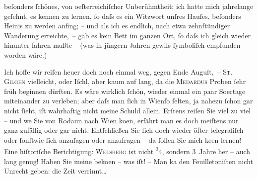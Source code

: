                beſonders{ }ſchönes, von oeſterreichiſcher
               Unberühmtheit; ich hatte mich jahrelange geſehnt, es kennen zu lernen,{ }ſo daſs es ein
               Witzwort unſres Hauſes, beſonders Heinis zu
               werden anfing; – und als {\pb}ich es endlich, nach etwa
               zehnſtündiger Wanderung erreichte, – gab es kein Bett im ganzen Ort,{ }ſo daſs ich
               gleich wieder hinunter fahren mußte – (was in jüngern Jahren gewiſs{ }ſymboliſch
               empfunden worden wäre.)\pend
           
\pstart
           Ich hoffe wir reiſen heuer doch noch einmal weg, gegen Ende Auguſt, –
                  \textsc{St. Gilgen} vielleicht, oder Iſchl, aber kaum auf lang,
               da die \textsc{Medardus} Proben{ }ſehr früh beginnen dürften. \strikeout{\textcolor{gray}{Also}} Es wäre wirklich{ }ſchön, wieder einmal ein paar So{\geminationm}ertage miteinander zu verleben; aber daſs man{ }ſich in Wienſo{ }ſelten, ja nahezu{ }ſchon gar nicht{ }ſieht, iſt
               wahrhaftig nicht {\pb}meine Schuld allein. Erſtens reiſen Sie
               viel zu viel – und we{\geminationn} Sie von Rodaun nach Wien ko{\geminationm}en, erfährt man es doch meiſtens nur ganz zufällig oder
               gar nicht. Entſchließen Sie{ }ſich doch wieder öfter telegrafiſch oder{ }ſonſtwie{ }ſich
               anzuſagen oder anzufragen – da{\geminationn}{ }ſollen Sie mich ke{\geminationn}en lernen! Eine hiſtoriſche Berichtigung: \textsc{Welsberg} ist nicht \substVorne{}\textsuperscript{3}\substDazwischen{}4\substHinten{}, sondern 3 Jahre her – auch lang genug! Haben Sie meine \label{K_L01952-4v}\label{K_L01952-4} beko{\geminationm}en – was \label{K_L01952-5v}\label{K_L01952-5} iſt! – Man ka{\geminationn} den Feuilletoniſten nicht Unrecht
               geben: die Zeit verrinnt{\dots}\pend
           
